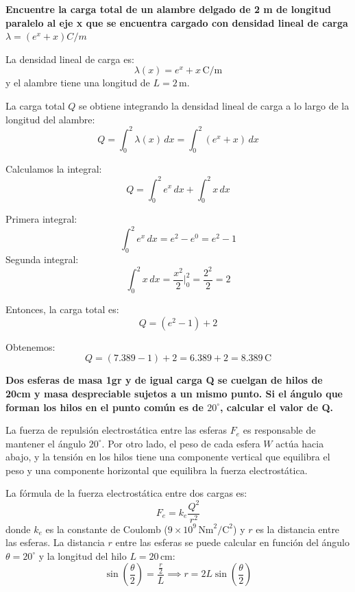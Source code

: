 \documentclass[answers]{exam} %
\begin{document}
\begin{questions}
	\vspace{0.5cm}

	\question \large\textbf{Encuentre la carga total de un alambre delgado de 2 m de longitud paralelo al eje x que se encuentra cargado con densidad lineal de carga $\lambda = (e^x + x) C/m$  }

	\vspace{0.5cm}

	\begin{multicols}{2} %
		La densidad lineal de carga es:
		\[
			\lambda(x) = e^x + x \, \text{C/m}
		\]
		y el alambre tiene una longitud de \( L = 2 \, \text{m} \).

		La carga total \( Q \) se obtiene integrando la densidad lineal de carga a lo largo de la longitud del alambre:
		\[
			Q = \int_0^2 \lambda(x) \, dx = \int_0^2 (e^x + x) \, dx
		\]

		Calculamos la integral:
		\[
			Q = \int_0^2 e^x \, dx + \int_0^2 x \, dx
		\]

		Primera integral:
		\[
			\int_0^2 e^x \, dx = e^2 - e^0 = e^2 - 1
		\]
		Segunda integral:
		\[
			\int_0^2 x \, dx = \frac{x^2}{2} \Bigg|_0^2 = \frac{2^2}{2} = 2
		\]

		Entonces, la carga total es:
		\[
			Q = (e^2 - 1) + 2
		\]

		Obtenemos:
		\[
			Q = (7.389 - 1) + 2 = 6.389 + 2 = 8.389 \, \text{C}
		\]
	\end{multicols}

	\vspace{0.5cm}

	\question \large\textbf{Dos esferas de masa 1gr y de igual carga Q se cuelgan de hilos de 20cm y masa despreciable sujetos a un mismo punto. Si el ángulo que forman los hilos en el punto
		común es de $20^{\circ}$, calcular el valor de Q.  }

	\begin{multicols}{2} %

		La fuerza de repulsión electrostática entre las esferas \( F_e \) es responsable de mantener el ángulo \( 20^\circ \). Por otro lado, el peso de cada esfera \( W \) actúa hacia abajo, y la tensión en los hilos tiene una componente vertical que equilibra el peso y una componente horizontal que equilibra la fuerza electrostática.

		La fórmula de la fuerza electrostática entre dos cargas es:
		\[
			F_e = k_e \frac{Q^2}{r^2}
		\]
		donde \( k_e \) es la constante de Coulomb (\( 9 \times 10^9 \, \text{Nm}^2/\text{C}^2 \)) y \( r \) es la distancia entre las esferas. La distancia \( r \) entre las esferas se puede calcular en función del ángulo \( \theta = 20^\circ \) y la longitud del hilo \( L = 20 \, \text{cm} \):
		\[
			\sin\left(\frac{\theta}{2}\right) = \dfrac{\frac{r}{2}}{L}\implies r = 2L \sin\left(\frac{\theta}{2}\right)
		\]


\end{multicols}
\end{questions}
\end{document}
